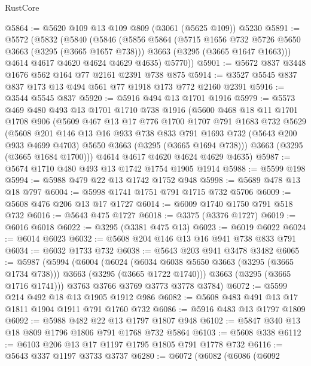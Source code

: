 \begin{lexlean}{RustCore}
\begin{coremodule}
@5864 := @5620 @109 @13 @109 @809 (@3061 (@5625 @109)) @5230
@5891 := @5572
    (@5832
      (@5840
        (@5846
          (@5856
            @5864
            (@5715 @1656 @732 @5726 @5650 @3663 (@3295 (@3665 @1657 @738)))
            @3663
            (@3295 (@3665 @1647 @1663)))
          @4614
          @4617
          @4620
          @4624
          @4629
          @4635)
        @5770))
@5901 := @5672 @837 @3448 @1676 @562 @164 @77 @2161 @2391 @738 @875
@5914 := @3527 @5545 @837 @837 @173 @13 @494 @561 @77 @1918 @173 @772 @2160 @2391
@5916 := @3544 @5545 @837
@5920 := @5916 @494 @13 @1701 @1916
@5979 := @5573
    @469
    @480
    @493
    @13
    @1701
    @1710
    @738
    @1916
    (@5600
      @468
      @18
      @11
      @1701
      @1708
      @906
      (@5609
        @467
        @13
        @17
        @776
        @1700
        @1707
        @791
        @1683
        @732
        @5629
        (@5608
          @201
          @146
          @13
          @16
          @933
          @738
          @833
          @791
          @1693
          @732
          (@5643 @200 @933 @4699 @4703)
          @5650
          @3663
          (@3295 (@3665 @1694 @738)))
        @3663
        (@3295 (@3665 @1684 @1700)))
      @4614
      @4617
      @4620
      @4624
      @4629
      @4635)
@5987 := @5674 @1710 @480 @493 @13 @1742 @1754 @1905 @1914
@5988 := @5599 @198
@5994 := @5988 @479 @22 @13 @1742 @1752 @948
@5998 := @5689 @478 @13 @18 @797
@6004 := @5998 @1741 @1751 @791 @1715 @732 @5706
@6009 := @5608 @476 @206 @13 @17 @1727
@6014 := @6009 @1740 @1750 @791 @518 @732
@6016 := @5643 @475 @1727
@6018 := @3375 (@3376 @1727)
@6019 := @6016 @6018
@6022 := @3295 (@3381 @475 @13)
@6023 := @6019 @6022
@6024 := @6014 @6023
@6032 := @5608 @204 @146 @13 @16 @941 @738 @833 @791
@6034 := @6032 @1733 @732
@6038 := @5643 @203 @941 @3478 @3482
@6065 := @5987
    (@5994
      (@6004
        (@6024
          (@6034 @6038 @5650 @3663 (@3295 (@3665 @1734 @738)))
          @3663
          (@3295 (@3665 @1722 @1740)))
        @3663
        (@3295 (@3665 @1716 @1741)))
      @3763
      @3766
      @3769
      @3773
      @3778
      @3784)
@6072 := @5599 @214 @492 @18 @13 @1905 @1912 @986
@6082 := @5608 @483 @491 @13 @17 @1811 @1904 @1911 @791 @1760 @732
@6086 := @5916 @483 @13 @1797 @1809
@6092 := @5988 @482 @22 @13 @1797 @1807 @948
@6102 := @5847 @340 @13 @18 @809 @1796 @1806 @791 @1768 @732 @5864
@6103 := @5608 @338
@6112 := @6103 @206 @13 @17 @1197 @1795 @1805 @791 @1778 @732
@6116 := @5643 @337 @1197 @3733 @3737
@6280 := @6072
    (@6082
      (@6086
        (@6092

\end{coremodule}
\end{lexlean}
